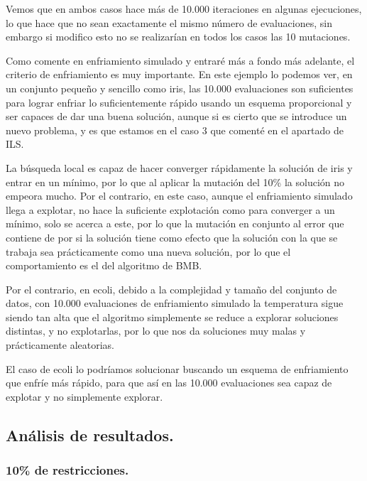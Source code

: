 \documentclass[12pt, spanish]{article}
\begin{document}
Vemos que en ambos casos hace más de 10.000 iteraciones en algunas ejecuciones, lo que hace que no sean exactamente el mismo número de evaluaciones, sin embargo si modifico esto no se realizarían en todos los casos las 10 mutaciones.

Como comente en enfriamiento simulado y entraré más a fondo más adelante, el criterio de enfriamiento es muy importante. En este ejemplo lo podemos ver, en un conjunto pequeño y sencillo como iris, las 10.000 evaluaciones son suficientes para lograr enfriar lo suficientemente rápido usando un esquema proporcional y ser capaces de dar una buena solución, aunque si es cierto que se introduce un nuevo problema, y es que estamos en el caso 3 que comenté en  el apartado de ILS. 

La búsqueda local es capaz de hacer converger rápidamente la solución de iris y entrar en un mínimo, por lo que al aplicar la mutación del 10\% la solución no empeora mucho. Por el contrario, en este caso, aunque el enfriamiento simulado llega a explotar, no hace la suficiente explotación como para converger a un mínimo, solo se acerca a este, por lo que la mutación en conjunto al error que contiene de por si la solución tiene como efecto que la solución con la que se trabaja sea prácticamente como una nueva solución, por lo que el comportamiento es el del algoritmo de BMB. 


Por el contrario, en ecoli, debido a la complejidad y tamaño del conjunto de datos, con 10.000 evaluaciones de enfriamiento simulado la temperatura sigue siendo tan alta que el algoritmo simplemente se reduce a explorar soluciones distintas, y no explotarlas, por lo que nos da soluciones muy malas y prácticamente aleatorias.

El caso de ecoli lo podríamos solucionar buscando un esquema de enfriamiento que enfríe más rápido, para que así en las 10.000 evaluaciones sea capaz de explotar y no simplemente explorar.


\subsection{Análisis de resultados.	}

\subsubsection{10\% de restricciones.}
\end{document}
